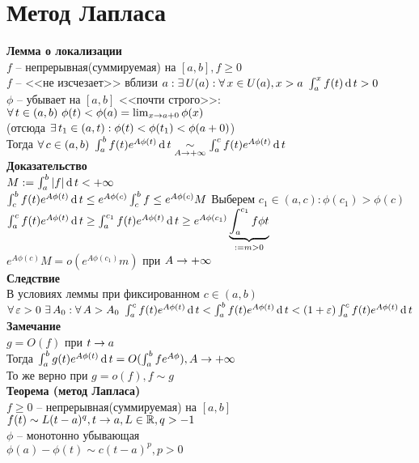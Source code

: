 \documentclass[12pt]{article}
\begin{document}
\section{Метод Лапласа}
\textbf{Лемма о локализации}\\
$f$ -- непрерывная(суммируемая) на $[a,b], f \geq 0$\\
$f$ -- <<не изсчезает>> вблизи $a: \ex U(a): \fall x \in U(a), x > a\ \int_a^x f(t)\df t > 0$\\
$\phi$ -- убывает на $[a, b]$ <<почти строго>>:\\
$\fall t \in (a, b)\ \phi(t) < \phi(a) = \lim_{x \rto a + 0} \phi(x)$\\
(отсюда $\ex t_1 \in (a, t): \phi(t) < \phi(t_1) < \phi(a+0)$)\\
Тогда $\fall c \in (a, b)\ \int_a^b f(t)e^{A\phi(t)}\df t \us{A \rto +\infty}\sim \int_a^c f(t)e^{A\phi(t)}\df t$\\
\textbf{Доказательство}\\
$M := \int_a^b |f|\df t < +\infty$\\
$\int_c^b f(t)e^{A\phi(t)}\df t \leq e^{A\phi(c)}\int_c^b f \leq e^{A\phi(c)}M$
Выберем $c_1 \in (a, c): \phi(c_1) > \phi(c)$\\
$\int_a^c f(t)e^{A\phi(t)}\df t \geq \int_a^{c_1} f(t)e^{A\phi(t)} \df t \geq e^{A\phi(c_1)} \ub{:=m >0}{\int_a^{c_1} f \phi t}$\\
$e^{A\phi(c)}M = o(e^{A\phi(c_1)}m)$ при $A \rto +\infty$\\
\textbf{Следствие}\\
В условиях леммы при фиксированном $c\in (a,b)$\\
$\fall \eps > 0\ \ex A_0: \fall A > A_0\ \int_a^c f(t)e^{A\phi(t)} \df t < \int_a^b f(t)e^{A\phi(t)} \df t < (1 + \eps)\int_a^c f(t)e^{A\phi(t)} \df t$\\
\textbf{Замечание}\\
$g = O(f)$ при $t \rto a$\\
Тогда $\int_a^b g(t)e^{A\phi(t)}\df t = O(\int_a^b fe^{A\phi}), A \rto +\infty$\\
То же верно при $g=o(f), f \sim g$\\
\textbf{Теорема (метод Лапласа)}\\
$f \geq 0$ -- непрерывная(суммируемая) на $[a,b]$\\
$f(t) \sim L(t-a)^q, t \rto a, L \in \Rset, q > -1$\\
$\phi$ -- монотонно убывающая\\
$\phi(a) - \phi(t) \sim c(t-a)^p, p > 0$\\
\end{document}
